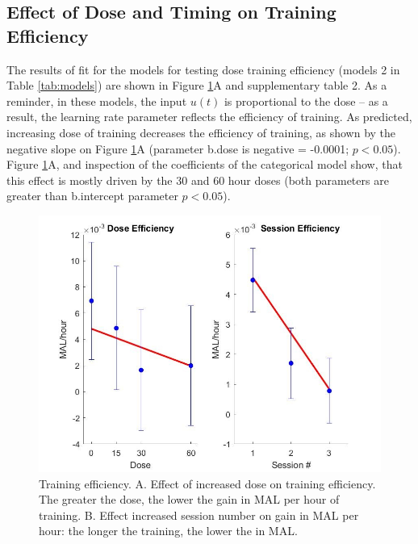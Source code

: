 \subsection{Effect of Dose and Timing on Training Efficiency}
The results of fit for the models for testing dose training efficiency (models 2 in Table \ref{tab:models}) are shown in Figure \ref{fig:doseefficiency}A and supplementary table 2. 
As a reminder, in these models, the input $ u(t) $ is proportional to the dose – as a result, the learning rate parameter reflects the efficiency of training. 
As predicted, increasing dose of training decreases the efficiency of training, as shown by the negative slope on Figure \ref{fig:doseefficiency}A (parameter b.dose is negative  = -0.0001; $ p < 0.05 $). 
Figure \ref{fig:doseefficiency}A, and inspection of the coefficients of the categorical model show, that this effect is mostly driven by the 30 and 60 hour doses (both parameters are greater than b.intercept parameter $ p < 0.05 $).


\begin{figure}
	\centering
	\includegraphics[width=0.7\linewidth]{figures/doseEfficiency}
	\caption[Training efficiency.]{Training efficiency. 
		A. Effect of increased dose on training efficiency. The greater the dose, the lower the gain in MAL per hour of training. 
		B. Effect increased session number on gain in MAL per hour: the longer the training, the lower the in MAL.}
	\label{fig:doseefficiency}
\end{figure}


